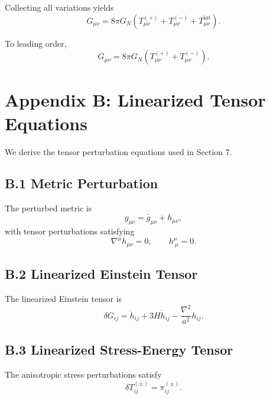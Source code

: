 \documentclass[11pt,a4paper]{article}
\begin{document}
Collecting all variations yields
\begin{equation}
G_{\mu\nu} = 8\pi G_N 
\left( T_{\mu\nu}^{(+)} + T_{\mu\nu}^{(-)} + T_{\mu\nu}^{\mathrm{int}} \right).
\end{equation}

To leading order,
\begin{equation}
G_{\mu\nu} = 8\pi G_N 
\left( T_{\mu\nu}^{(+)} + T_{\mu\nu}^{(-)} \right).
\end{equation}

\section*{Appendix B: Linearized Tensor Equations}

We derive the tensor perturbation equations used in Section 7.

\subsection*{B.1 Metric Perturbation}

The perturbed metric is
\begin{equation}
g_{\mu\nu} = \bar{g}_{\mu\nu} + h_{\mu\nu},
\end{equation}
with tensor perturbations satisfying
\begin{equation}
\nabla^\mu h_{\mu\nu} = 0, \qquad h^\mu_{\ \mu} = 0.
\end{equation}

\subsection*{B.2 Linearized Einstein Tensor}

The linearized Einstein tensor is
\begin{equation}
\delta G_{ij} = 
\ddot{h}_{ij} + 3H \dot{h}_{ij} - \frac{\nabla^2}{a^2} h_{ij}.
\end{equation}

\subsection*{B.3 Linearized Stress-Energy Tensor}

The anisotropic stress perturbations satisfy
\begin{equation}
\delta T_{ij}^{(\pm)} = \pi_{ij}^{(\pm)}.
\end{equation}
\end{document}
